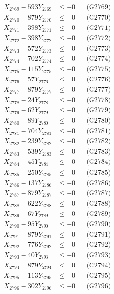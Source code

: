 \documentclass[a4paper,10pt]{article}
\begin{document}
{\begin{align}
X_{2769} - 593Y_{2769} &\leq +0 && \text{(G2769)} \\
X_{2770} - 879Y_{2770} &\leq +0 && \text{(G2770)} \\
\allowbreak
X_{2771} - 398Y_{2771} &\leq +0 && \text{(G2771)} \\
X_{2772} - 398Y_{2772} &\leq +0 && \text{(G2772)} \\
X_{2773} - 572Y_{2773} &\leq +0 && \text{(G2773)} \\
X_{2774} - 702Y_{2774} &\leq +0 && \text{(G2774)} \\
X_{2775} - 115Y_{2775} &\leq +0 && \text{(G2775)} \\
X_{2776} - 57Y_{2776} &\leq +0 && \text{(G2776)} \\
X_{2777} - 879Y_{2777} &\leq +0 && \text{(G2777)} \\
X_{2778} - 24Y_{2778} &\leq +0 && \text{(G2778)} \\
X_{2779} - 62Y_{2779} &\leq +0 && \text{(G2779)} \\
X_{2780} - 89Y_{2780} &\leq +0 && \text{(G2780)} \\
\allowbreak
X_{2781} - 704Y_{2781} &\leq +0 && \text{(G2781)} \\
X_{2782} - 239Y_{2782} &\leq +0 && \text{(G2782)} \\
X_{2783} - 539Y_{2783} &\leq +0 && \text{(G2783)} \\
X_{2784} - 45Y_{2784} &\leq +0 && \text{(G2784)} \\
X_{2785} - 250Y_{2785} &\leq +0 && \text{(G2785)} \\
X_{2786} - 137Y_{2786} &\leq +0 && \text{(G2786)} \\
X_{2787} - 879Y_{2787} &\leq +0 && \text{(G2787)} \\
X_{2788} - 622Y_{2788} &\leq +0 && \text{(G2788)} \\
X_{2789} - 67Y_{2789} &\leq +0 && \text{(G2789)} \\
X_{2790} - 95Y_{2790} &\leq +0 && \text{(G2790)} \\
\allowbreak
X_{2791} - 879Y_{2791} &\leq +0 && \text{(G2791)} \\
X_{2792} - 776Y_{2792} &\leq +0 && \text{(G2792)} \\
X_{2793} - 40Y_{2793} &\leq +0 && \text{(G2793)} \\
X_{2794} - 879Y_{2794} &\leq +0 && \text{(G2794)} \\
X_{2795} - 113Y_{2795} &\leq +0 && \text{(G2795)} \\
X_{2796} - 302Y_{2796} &\leq +0 && \text{(G2796)} \\

\end{align}}
\end{document}

